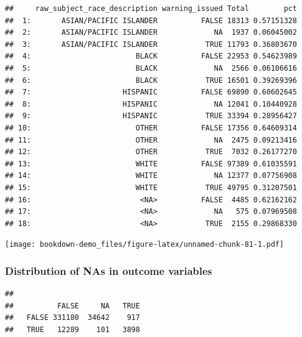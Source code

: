 \documentclass[
]{book}
\newenvironment{Shaded}{\begin{snugshade}}{\end{snugshade}}
\newcommand{\CommentTok}[1]{\textcolor[rgb]{0.56,0.35,0.01}{\textit{#1}}}
\newcommand{\KeywordTok}[1]{\textcolor[rgb]{0.13,0.29,0.53}{\textbf{#1}}}
\newcommand{\NormalTok}[1]{#1}
\newcommand{\OperatorTok}[1]{\textcolor[rgb]{0.81,0.36,0.00}{\textbf{#1}}}
\begin{document}
\begin{verbatim}
##     raw_subject_race_description warning_issued Total        pct
##  1:       ASIAN/PACIFIC ISLANDER          FALSE 18313 0.57151328
##  2:       ASIAN/PACIFIC ISLANDER             NA  1937 0.06045002
##  3:       ASIAN/PACIFIC ISLANDER           TRUE 11793 0.36803670
##  4:                        BLACK          FALSE 22953 0.54623989
##  5:                        BLACK             NA  2566 0.06106616
##  6:                        BLACK           TRUE 16501 0.39269396
##  7:                     HISPANIC          FALSE 69890 0.60602645
##  8:                     HISPANIC             NA 12041 0.10440928
##  9:                     HISPANIC           TRUE 33394 0.28956427
## 10:                        OTHER          FALSE 17356 0.64609314
## 11:                        OTHER             NA  2475 0.09213416
## 12:                        OTHER           TRUE  7032 0.26177270
## 13:                        WHITE          FALSE 97389 0.61035591
## 14:                        WHITE             NA 12377 0.07756908
## 15:                        WHITE           TRUE 49795 0.31207501
## 16:                         <NA>          FALSE  4485 0.62162162
## 17:                         <NA>             NA   575 0.07969508
## 18:                         <NA>           TRUE  2155 0.29868330
\end{verbatim}

\texttt{[image: bookdown-demo\_files/figure-latex/unnamed-chunk-81-1.pdf]}

\hypertarget{distribution-of-nas-in-outcome-variables}{%
\subsubsection{Distribution of NAs in outcome variables}\label{distribution-of-nas-in-outcome-variables}}

\begin{Shaded}
\end{Shaded}

\begin{verbatim}
##        
##          FALSE     NA   TRUE
##   FALSE 331180  34642    917
##   TRUE   12289    101   3898
\end{verbatim}
\end{document}
